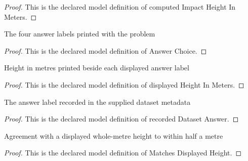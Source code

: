 \begin{proof}
  This is the declared model definition of computed Impact Height In Meters.
\end{proof}
\begin{definition}
  \label{def:physics:phyx-mini-0740:phyxminiproblems-problemphyxmini0740-answerchoice}
  The four answer labels printed with the problem
\end{definition}
\begin{proof}
  This is the declared model definition of Answer Choice.
\end{proof}
\begin{definition}
  \label{def:physics:phyx-mini-0740:phyxminiproblems-problemphyxmini0740-answerchoice-displayedheightinmeters}
  Height in metres printed beside each displayed answer label
\end{definition}
\begin{proof}
  This is the declared model definition of displayed Height In Meters.
\end{proof}
\begin{definition}
  \label{def:physics:phyx-mini-0740:phyxminiproblems-problemphyxmini0740-recordeddatasetanswer}
  The answer label recorded in the supplied dataset metadata
\end{definition}
\begin{proof}
  This is the declared model definition of recorded Dataset Answer.
\end{proof}
\begin{definition}
  \label{def:physics:phyx-mini-0740:phyxminiproblems-problemphyxmini0740-matchesdisplayedheight}
  Agreement with a displayed whole-metre height to within half a metre
\end{definition}
\begin{proof}
  This is the declared model definition of Matches Displayed Height.
\end{proof}
